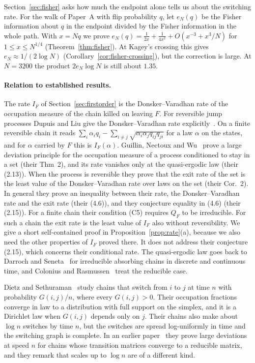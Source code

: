 Section~\ref{sec:fisher} asks how much the endpoint alone tells us about the
switching rate. For the walk of Paper~A with flip probability $q$, let
$e_N(q)$ be the Fisher information about $q$ in the endpoint divided by the
Fisher information in the whole path. With $x=Nq$ we prove
$e_N(q)=\frac1{2x}+\frac1{4x^2}+O(x^{-3}+x^3/N)$ for $1\le x\le N^{1/4}$
(Theorem~\ref{thm:fisher}). At Kagey's crossing this gives
$e_N\approx1/(2\log N)$ (Corollary~\ref{cor:fisher-crossing}), but the
correction is large. At $N=3200$ the product $2e_N\log N$ is still about
$1.35$.

\paragraph{Relation to established results.}
The rate $I_F$ of Section~\ref{sec:firstorder} is the Donsker--Varadhan
rate of the occupation measure of the chain killed on leaving $F$. For
reversible jump processes Dupuis and Liu give the Donsker--Varadhan rate
explicitly~\cite[Eq.~(3.2)]{dupuisliu2015}. On a finite reversible chain it
reads $\sum_i\alpha_iq_i-\sum_{i\ne j}\sqrt{\alpha_i\alpha_jq_{ij}q_{ji}}$ for
a law $\alpha$ on the states, and for $\alpha$ carried by $F$ this is
$I_F(\alpha)$. Guillin, Nectoux and Wu~\cite{gnw2024} prove a large
deviation principle for the occupation measure of a process conditioned to
stay in a set (their Thm~2), and its rate vanishes only at the
quasi-ergodic law (their (2.13)). When the process is reversible they prove
that the exit rate of the set is the least value of the Donsker--Varadhan
rate over laws on the set (their Cor.~2). In general they prove an
inequality between their rate, the Donsker--Varadhan rate and the exit rate
(their (4.6)), and they conjecture equality in (4.6) (their (2.15)). For a
finite chain their condition (C5) requires $Q_F$ to be irreducible. For such
a chain the exit rate is the least value of $I_F$ also without
reversibility. We give a short self-contained proof in
Proposition~\ref{prop:rate}(a), because we also need the other properties of
$I_F$ proved there. It does not address their conjecture (2.15), which
concerns their conditional rate. The quasi-ergodic law goes back to Darroch and
Seneta~\cite{darrochseneta1965,darrochseneta1967} for irreducible absorbing
chains in discrete and continuous time, and Colonius and
Rasmussen~\cite{coloniusrasmussen2021} treat the reducible case.

Dietz and Sethuraman~\cite{dietz2007} study chains that switch from $i$ to
$j$ at time $n$ with probability $G(i,j)/n$, where every $G(i,j)>0$. Their
occupation fractions converge in law to a distribution with full support on
the simplex, and it is a Dirichlet law when $G(i,j)$ depends only on $j$.
Their chains also make about $\log n$ switches by time $n$, but the
switches are spread log-uniformly in time and the switching graph is
complete. In an earlier paper~\cite{dietz2005} they prove large deviations
at speed $n$ for chains whose transition matrices converge to a reducible
matrix, and they remark that scales up to $\log n$ are of a different kind.

